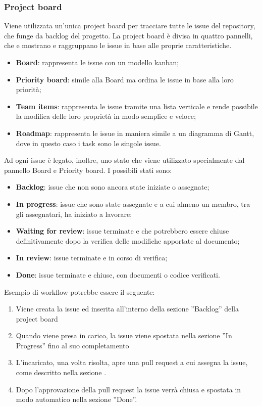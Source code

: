 \subsubsection{Project board}\label{inf:pb}
Viene utilizzata un'unica project board per tracciare tutte le issue del
repository, che funge da backlog del progetto. La project board è divisa in
quattro pannelli, che e mostrano e raggruppano le issue in base alle proprie
caratteristiche.
\begin{itemize}
    \item \textbf{Board}: rappresenta le issue con un modello kanban;
    \item \textbf{Priority board}: simile alla Board ma ordina le issue in base alla loro priorità;
    \item \textbf{Team items}: rappresenta le issue tramite una lista verticale e rende possibile
          la modifica delle loro proprietà in modo semplice e veloce;
    \item \textbf{Roadmap}: rappresenta le issue in maniera simile a un diagramma di Gantt,
          dove in questo caso i task sono le singole issue.
\end{itemize}
Ad ogni issue è legato, inoltre, uno stato che viene utilizzato specialmente dal pannello Board e Priority board.
I possibili stati sono:
\begin{itemize}
    \item \textbf{Backlog}: issue che non sono ancora state iniziate o assegnate;
    \item \textbf{In progress}: issue che sono state assegnate e a cui almeno un membro, tra gli assegnatari, ha iniziato a lavorare;
    \item \textbf{Waiting for review}: issue terminate e che potrebbero essere chiuse definitivamente dopo la verifica delle modifiche apportate al documento;
    \item \textbf{In review}: issue terminate e in corso di verifica;
    \item \textbf{Done}: issue terminate e chiuse, con documenti o codice verificati.
\end{itemize}
Esempio di workflow potrebbe essere il seguente:
\begin{enumerate}
    \item Viene creata la issue ed inserita all'interno della sezione ”Backlog” della
          project board
    \item Quando viene presa in carico, la issue viene spostata nella sezione ”In
          Progress” fino al suo completamento
    \item L'incaricato, una volta risolta, apre una pull request a cui assegna la issue,
          come descritto nella sezione .
    \item Dopo l'approvazione della pull request la issue verrà chiusa e spostata in modo
          automatico nella sezione ”Done”.
\end{enumerate}

